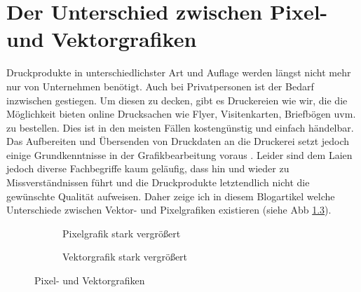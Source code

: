 \chapter{Der Unterschied zwischen Pixel- und Vektorgrafiken}
\label{cha:der_unterschied_zwischen_pixel-_und_vektorgrafiken}
Druckprodukte in unterschiedlichster Art und Auflage werden längst nicht mehr nur von Unternehmen benötigt. Auch bei Privatpersonen ist der Bedarf inzwischen gestiegen. Um diesen zu decken, gibt es Druckereien wie wir, die die Möglichkeit bieten online Drucksachen wie Flyer, Visitenkarten, Briefbögen uvm. zu bestellen. Dies ist in den meisten Fällen kostengünstig und einfach händelbar. Das Aufbereiten und Übersenden von Druckdaten an die Druckerei setzt jedoch einige Grundkenntnisse in der Grafikbearbeitung voraus \cite{knuthwebsite}. Leider sind dem Laien jedoch diverse Fachbegriffe kaum geläufig, dass hin und wieder zu Missverständnissen führt und die Druckprodukte letztendlich nicht die gewünschte Qualität aufweisen. Daher zeige ich in diesem Blogartikel welche Unterschiede zwischen Vektor- und Pixelgrafiken existieren (siehe Abb \ref{fig:pixel_vector_exp}).

\begin{figure}
\centering
	\begin{subfigure}[b]{5cm}            
		\caption{Pixelgrafik stark vergrößert}
		\label{fig:pixel}
	\end{subfigure}
%
\hspace{1cm}
%
	\begin{subfigure}[b]{5cm}
	\centering
		\caption{Vektorgrafik stark vergrößert}
		\label{fig:vector}
	\end{subfigure}

	\caption{Pixel- und Vektorgrafiken}
	\label{fig:pixel_vector_exp}
\end{figure}

